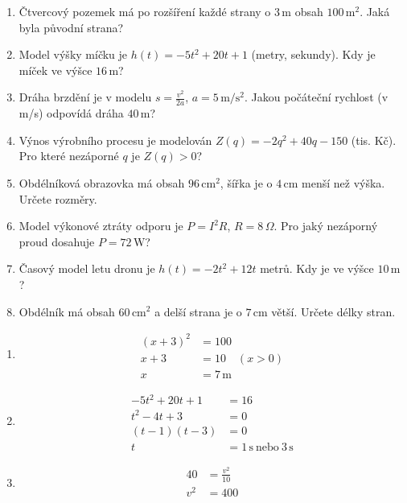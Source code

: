 \documentclass[11pt,a4paper]{article}
\begin{document}
\begin{zadaniReseniBox}[title={Domácí úkol}]
\begin{enumerate}[label=\alph*),itemsep=2pt]
\item Čtvercový pozemek má po rozšíření každé strany o $3\,\mathrm m$ obsah $100\,\mathrm{m^2}$. Jaká byla původní strana?
\item Model výšky míčku je $h(t)=-5t^2+20t+1$ (metry, sekundy). Kdy je míček ve výšce $16\,\mathrm m$?
\item Dráha brzdění je v modelu $s=\frac{v^2}{2a}$, $a=5\,\mathrm{m/s^2}$. Jakou počáteční rychlost (v m/s) odpovídá dráha $40\,\mathrm m$?
\item Výnos výrobního procesu je modelován $Z(q)=-2q^2+40q-150$ (tis. Kč). Pro které nezáporné $q$ je $Z(q)>0$?
\item Obdélníková obrazovka má obsah $96\,\mathrm{cm^2}$, šířka je o $4\,\mathrm{cm}$ menší než výška. Určete rozměry.
\item Model výkonové ztráty odporu je $P=I^2R$, $R=8\,\Omega$. Pro jaký nezáporný proud dosahuje $P=72\,\mathrm W$?
\item Časový model letu dronu je $h(t)=-2t^2+12t$ metrů. Kdy je ve výšce $10\,\mathrm m$?
\item Obdélník má obsah $60\,\mathrm{cm^2}$ a delší strana je o $7\,\mathrm{cm}$ větší. Určete délky stran.
\end{enumerate}
\tcblower
\begin{enumerate}[label=\alph*),itemsep=2pt]
\item
\[\begin{aligned}
(x+3)^2&=100\\[2pt]
x+3&=10\quad (x>0)\\[2pt]
x&=7\,\mathrm m
\end{aligned}\]
\item
\[\begin{aligned}
-5t^2+20t+1&=16\\[2pt]
t^2-4t+3&=0\\[2pt]
(t-1)(t-3)&=0\\[2pt]
t&=1\,\mathrm s\ \text{nebo}\ 3\,\mathrm s
\end{aligned}\]
\item
\[\begin{aligned}
40&=\frac{v^2}{10}\\[2pt]
v^2&=400\\[2pt]

\end{aligned}\]
\end{enumerate}
\end{zadaniReseniBox}
\end{document}
